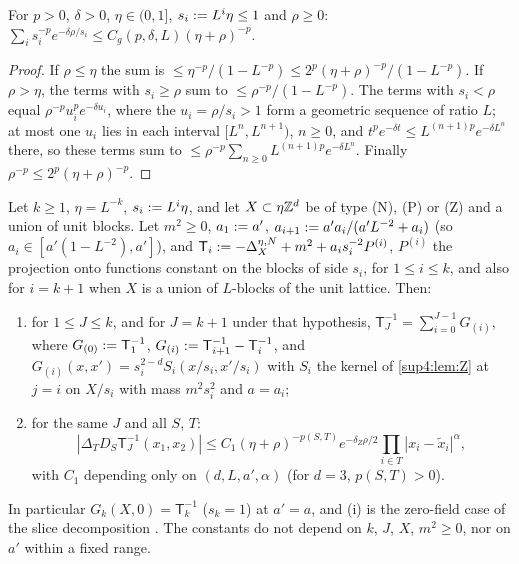 \begin{lemma}\label{sup4:lem:GS}
For $p>0$, $\delta>0$, $\eta\in(0,1]$, $s_i:= L^i\eta\le1$ and $\rho\ge0$: $\sum_is_i^{-p}e^{-\delta\rho/s_i}\le C_g(p,\delta,L)(\eta+\rho)^{-p}$.
\end{lemma}

\begin{proof}
If $\rho\le\eta$ the sum is $\le\eta^{-p}/(1-L^{-p})\le2^p(\eta+\rho)^{-p}/(1-L^{-p})$. If $\rho>\eta$, the terms with $s_i\ge\rho$ sum to $\le\rho^{-p}/(1-L^{-p})$. The terms with $s_i<\rho$ equal $\rho^{-p}u_i^pe^{-\delta u_i}$, where the $u_i=\rho/s_i>1$ form a geometric sequence of ratio $L$; at most one $u_i$ lies in each interval $[L^n,L^{n+1})$, $n\ge0$, and $t^pe^{-\delta t}\le L^{(n+1)p}e^{-\delta L^n}$ there, so these terms sum to $\le\rho^{-p}\sum_{n\ge0}L^{(n+1)p}e^{-\delta L^n}$. Finally $\rho^{-p}\le2^p(\eta+\rho)^{-p}$.
\end{proof}

\begin{corollary}\label{sup4:cor:Z1}
Let $k\ge1$, $\eta=L^{-k}$, $s_i:= L^i\eta$, and let $X\subset\eta\mathbb Z^d$ be of type \textup{(N)}, \textup{(P)} or \textup{(Z)} and a union of unit blocks. Let $m^2\ge0$, $a_1:= a'$, $a_{i+1}:= a'a_i/(a'L^{-2}+a_i)$ (so $a_i\in[a'(1-L^{-2}),a']$), and $\mathsf T_i:=-\Delta^{\eta,N}_X+m^2+a_is_i^{-2}P^{(i)}$, $P^{(i)}$ the projection onto functions constant on the blocks of side $s_i$, for $1\le i\le k$, and also for $i=k+1$ when $X$ is a union of $L$-blocks of the unit lattice. Then:
\begin{enumerate}[label=\textup{(\roman*)},nosep,leftmargin=*]
\item for $1\le J\le k$, and for $J=k+1$ under that hypothesis, $\mathsf T_J^{-1}=\sum_{i=0}^{J-1}G_{(i)}$, where $G_{(0)}:=\mathsf T_1^{-1}$, $G_{(i)}:=\mathsf T_{i+1}^{-1}-\mathsf T_i^{-1}$, and $G_{(i)}(x,x')=s_i^{2-d}S_i(x/s_i,x'/s_i)$ with $S_i$ the kernel of \cref{sup4:lem:Z} at $j=i$ on $X/s_i$ with mass $m^2s_i^2$ and $a=a_i$;
\item for the same $J$ and all $S$, $T$:
\begin{equation}\label{sup4:eq:Z1}
|\Delta_TD_S\mathsf T_J^{-1}(x_1,x_2)|\le C_1(\eta+\rho)^{-p(S,T)}e^{-\delta_Z\rho/2}\prod_{i\in T}|x_i-\tilde x_i|^\alpha,
\end{equation}
with $C_1$ depending only on $(d,L,a',\alpha)$ (for $d=3$, $p(S,T)>0$).
\end{enumerate}
In particular $G_k(X,0)=\mathsf T_k^{-1}$ ($s_k=1$) at $a'=a$, and (i) is the zero-field case of the slice decomposition \cite[(2.6)]{Ba3}. The constants do not depend on $k$, $J$, $X$, $m^2\ge0$, nor on $a'$ within a fixed range.
\end{corollary}


